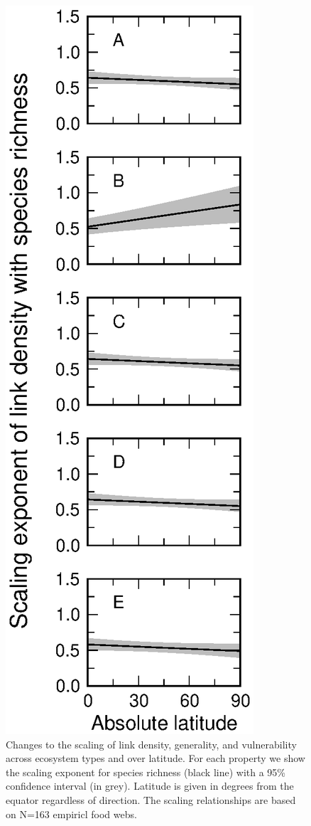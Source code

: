 \documentclass[12pt]{article}
\begin{document}

\begin{figure}[h]
\includegraphics[width=.85\textwidth]{Figures/by_TL/marginal/justS_marginal_latitude.eps}
\caption{Changes to the scaling of link density, generality, and vulnerability across ecosystem
types and over latitude. For each property we show the scaling exponent for species richness (black
line) with a 95\% confidence interval (in grey). Latitude is given in degrees from the equator
regardless of direction. The scaling relationships are based on N=163 empiricl food webs.}
\label{S}
\end{figure}
\end{document}
